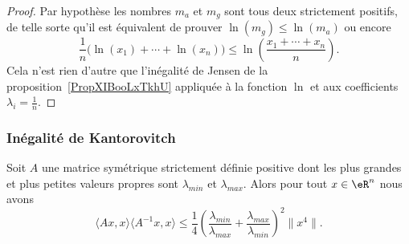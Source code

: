 \begin{proof}
	Par hypothèse les nombres \( m_a\) et \( m_g\) sont tous deux strictement positifs, de telle sorte qu'il est équivalent de prouver \( \ln(m_g)\leq \ln(m_a)\) ou encore
	\begin{equation}
		\frac{1}{ n }\big( \ln(x_1)+\cdots +\ln(x_n) \big)\leq \ln\left( \frac{ x_1+\cdots +x_n }{ n } \right).
	\end{equation}
	Cela n'est rien d'autre que l'inégalité de Jensen de la proposition~\ref{PropXIBooLxTkhU} appliquée à la fonction \( \ln\) et aux coefficients \( \lambda_i=\frac{1}{ n }\).
\end{proof}

\subsubsection{Inégalité de Kantorovitch}

\begin{proposition}    \label{PropMNUooFbYkug}
	Soit \( A\) une matrice symétrique strictement définie positive dont les plus grandes et plus petites valeurs propres sont \( \lambda_{min}\) et \( \lambda_{max}\). Alors pour tout \( x\in \eR^n\) nous avons
	\begin{equation}
		\langle Ax, x\rangle \langle A^{-1}x, x\rangle \leq \frac{1}{ 4 }\left( \frac{ \lambda_{min} }{ \lambda_{max} }+\frac{ \lambda_{max} }{ \lambda_{min} } \right)^2\| x^4 \|.
	\end{equation}
\end{proposition}

